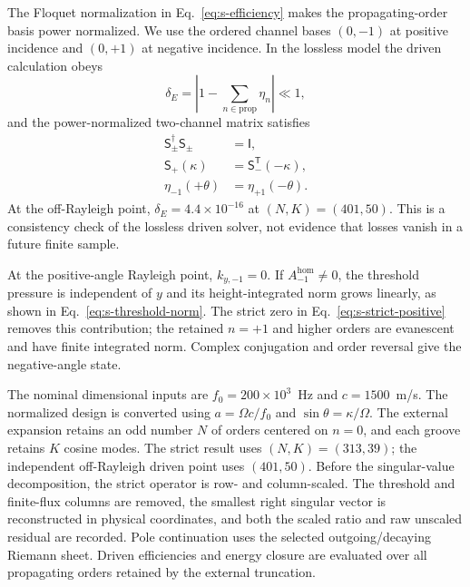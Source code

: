 \documentclass[aps,prl,reprint,superscriptaddress,nofootinbib,floatfix]{revtex4-2}
\providecommand{\hom}{\mathrm{hom}}
\begin{document}
The Floquet normalization in Eq.~\eqref{eq:s-efficiency} makes the
propagating-order basis power normalized.  We use the ordered channel bases
$(0,-1)$ at positive incidence and $(0,+1)$ at negative incidence.  In the lossless model the driven
calculation obeys
\begin{equation}
 \delta_E=\left|1-\sum_{n\in\mathrm{prop}}\eta_n\right|\ll1 ,
 \label{eq:s-energy-error}
\end{equation}
and the power-normalized two-channel matrix satisfies
\begin{equation}
\begin{aligned}
 \mathsf S_\pm^\dagger\mathsf S_\pm&=\mathsf I,\\
 \mathsf S_+(\kappa)&=\mathsf S_-^{\mathsf T}(-\kappa),\\
 \eta_{-1}(+\theta)&=\eta_{+1}(-\theta).
\end{aligned}
 \label{eq:s-reciprocity}
\end{equation}
At the off-Rayleigh point, $\delta_E=4.4\times10^{-16}$ at $(N,K)=(401,50)$.
This is a consistency check of the lossless driven solver, not evidence that
losses vanish in a future finite sample.

At the positive-angle Rayleigh point, $k_{y,-1}=0$.  If
$A_{-1}^{\hom}\neq0$, the threshold pressure is independent of $y$ and its
height-integrated norm grows linearly, as shown in Eq.~\eqref{eq:s-threshold-norm}.
The strict zero in Eq.~\eqref{eq:s-strict-positive} removes this contribution;
the retained $n=+1$ and higher orders are evanescent and have finite integrated
norm.  Complex conjugation and order reversal give the negative-angle state.

The nominal dimensional inputs are $f_0=200\times10^3$~Hz and $c=1500$~m/s.
The normalized design is converted using $a=\Omega c/f_0$ and
$\sin\theta=\kappa/\Omega$.  The external expansion retains an odd number
$N$ of orders centered on $n=0$, and each groove retains $K$ cosine modes.
The strict result uses $(N,K)=(313,39)$; the independent off-Rayleigh driven
point uses $(401,50)$.  Before the singular-value decomposition, the strict
operator is row- and column-scaled.  The threshold and finite-flux columns
are removed, the smallest right singular vector is reconstructed in physical
coordinates, and both the scaled ratio and raw unscaled residual are recorded.
Pole continuation uses the selected outgoing/decaying Riemann sheet.  Driven
efficiencies and energy closure are evaluated over all propagating orders
retained by the external truncation.
\end{document}
